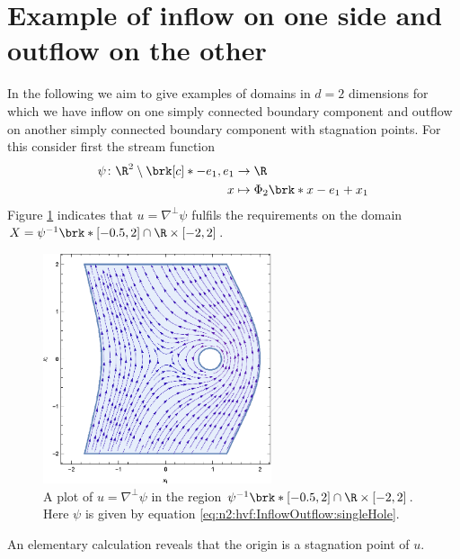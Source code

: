 \section{Example of inflow on one side and outflow on the other}
In the following we aim to give examples of domains in $d=2$ dimensions for which 
we have inflow on one simply connected boundary component and outflow on another simply connected boundary
component with stagnation points.
For this consider first the stream function
\begin{equation}
  \begin{aligned}
  \psi\colon \R^2\setminus\brk[c]*{-e_1,e_1}&\to\R \\
  x&\mapsto\Phi_2\brk*{x-e_1}+x_1
  \end{aligned}\label{eq:n2:hvf:InflowOutflow:singleHole}
\end{equation}
Figure \ref{pl:n2_hvf_InflowOutflow_asymmetric_single} indicates that $u=\nabla^\perp\psi$ fulfils the
requirements on the domain $X=\psi^{-1}\brk*{[-0.5,2]}\cap \R\times[-2,2]$.
\begin{figure}
  \centering
  \includegraphics[width=0.6\textwidth]{../Plots/HarmonicVectorFields_gr3.eps}
  \caption{A plot of $u=\nabla^\perp\psi$ in the region $\psi^{-1}\brk*{[-0.5,2]}\cap \R\times[-2,2]$.
  Here $\psi$ is given by equation \eqref{eq:n2:hvf:InflowOutflow:singleHole}.}
  \label{pl:n2_hvf_InflowOutflow_asymmetric_single}
\end{figure}
An elementary calculation reveals that the origin is a stagnation point of $u$.

